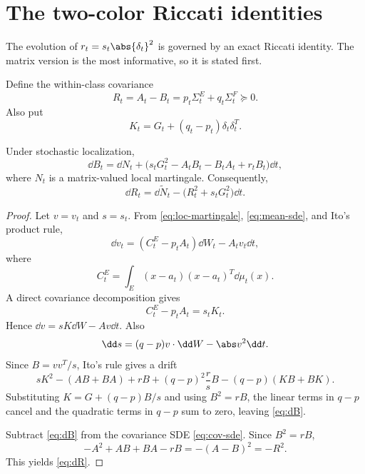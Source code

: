 \documentclass[../../main.tex]{subfiles}
\begin{document}
\section{The two-color Riccati identities}
\label{sec:riccati}

The evolution of $r_t=s_t\abs{\delta_t}^2$ is governed by an exact Riccati identity. The matrix
version is the most informative, so it is stated first.

Define the within-class covariance
\begin{equation}\label{eq:R-def}
  R_t=A_t-B_t=p_t\Sigma_t^E+q_t\Sigma_t^F\succeq0.
\end{equation}
Also put
\begin{equation}\label{eq:K-def}
  K_t=G_t+(q_t-p_t)\delta_t\delta_t^T.
\end{equation}

\begin{lemma}
\label{lem:matrix-riccati}
Under stochastic localization,
\begin{equation}\label{eq:dB}
  \dd B_t=\dd N_t+\bigl(s_tG_t^2-A_tB_t-B_tA_t+r_tB_t\bigr)\dd t,
\end{equation}
where $N_t$ is a matrix-valued local martingale. Consequently,
\begin{equation}\label{eq:dR}
  \dd R_t=\dd\widetilde N_t-\bigl(R_t^2+s_tG_t^2\bigr)\dd t .
\end{equation}
\end{lemma}

\begin{proof}
Let $v=v_t$ and $s=s_t$. From \eqref{eq:loc-martingale}, \eqref{eq:mean-sde}, and Ito's product
rule,
\begin{equation}\label{eq:dv}
  \dd v_t=(C_t^E-p_tA_t)\dd W_t-A_tv_t\dd t,
\end{equation}
where
\[
  C_t^E=\int_E(x-a_t)(x-a_t)^T\dd\mu_t(x).
\]
A direct covariance decomposition gives
\begin{equation}\label{eq:CE-minus-pA}
  C_t^E-p_tA_t=s_tK_t.
\end{equation}
Hence $\dd v=sK\dd W-Av\dd t$. Also
\[
  \dd s=(q-p)v\cdot\dd W-\abs v^2\dd t.
\]
Since $B=vv^T/s$, Ito's rule gives a drift
\[
  sK^2-(AB+BA)+rB+(q-p)^2\frac rsB-(q-p)(KB+BK).
\]
Substituting $K=G+(q-p)B/s$ and using $B^2=rB$, the linear terms in $q-p$ cancel and the quadratic
terms in $q-p$ sum to zero, leaving \eqref{eq:dB}.

Subtract \eqref{eq:dB} from the covariance SDE \eqref{eq:cov-sde}. Since $B^2=rB$,
\[
  -A^2+AB+BA-rB=-(A-B)^2=-R^2.
\]
This yields \eqref{eq:dR}.
\end{proof}
\end{document}
